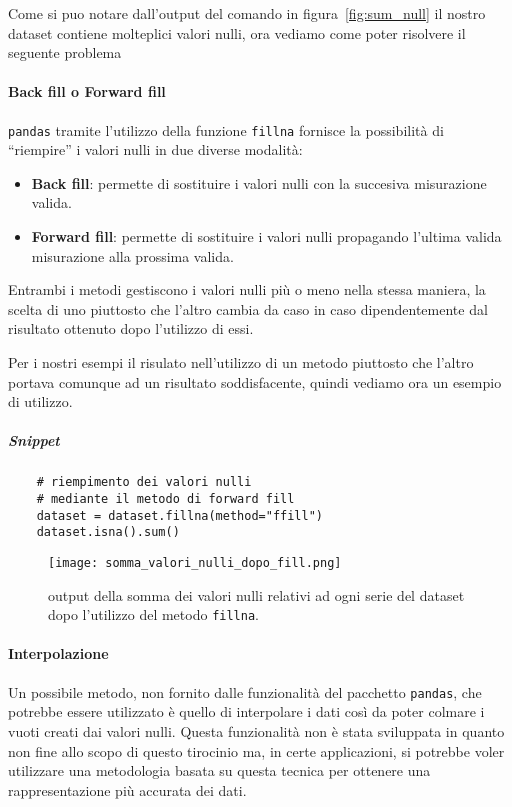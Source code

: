 Come si puo notare dall'output del comando in figura~\ref*{fig:sum_null}
il nostro dataset contiene molteplici valori nulli, ora vediamo come poter risolvere
il seguente problema


\paragraph{Back fill o Forward fill}
\texttt{pandas} tramite l'utilizzo della funzione \texttt{fillna} fornisce la possibilità di 
``riempire'' i valori nulli in due diverse modalità:

\begin{itemize}
    \item \textbf{Back fill}: permette di sostituire i valori nulli con la succesiva
    misurazione valida.
    \item \textbf{Forward fill}:  permette di sostituire i valori nulli propagando
    l'ultima valida misurazione alla prossima valida.
\end{itemize}

Entrambi i metodi gestiscono i valori nulli più o meno nella stessa maniera, la scelta
di uno piuttosto che l'altro cambia da caso in caso dipendentemente dal risultato
ottenuto dopo l'utilizzo di essi.

Per i nostri esempi il risulato nell'utilizzo di un metodo piuttosto che l'altro
portava comunque ad un risultato soddisfacente, quindi vediamo ora un esempio di
utilizzo.
\subparagraph*{Snippet}
\begin{verbatim}
    # riempimento dei valori nulli 
    # mediante il metodo di forward fill
    dataset = dataset.fillna(method="ffill")
    dataset.isna().sum()
\end{verbatim}
\begin{figure}[H]
    \centering
    \texttt{[image: somma\_valori\_nulli\_dopo\_fill.png]}
    \caption{output della somma dei valori nulli relativi ad ogni serie del dataset dopo l'utilizzo del metodo \texttt{fillna}.}
\end{figure}


\paragraph{Interpolazione} 
Un possibile metodo, non fornito dalle funzionalità del pacchetto \texttt{pandas},
che potrebbe essere utilizzato è quello di interpolare i dati così da poter colmare
i vuoti creati dai valori nulli. Questa funzionalità non è stata sviluppata
in quanto non fine allo scopo di questo tirocinio ma, in certe applicazioni, si potrebbe
voler utilizzare una metodologia basata su questa tecnica per ottenere una rappresentazione
più accurata dei dati.


